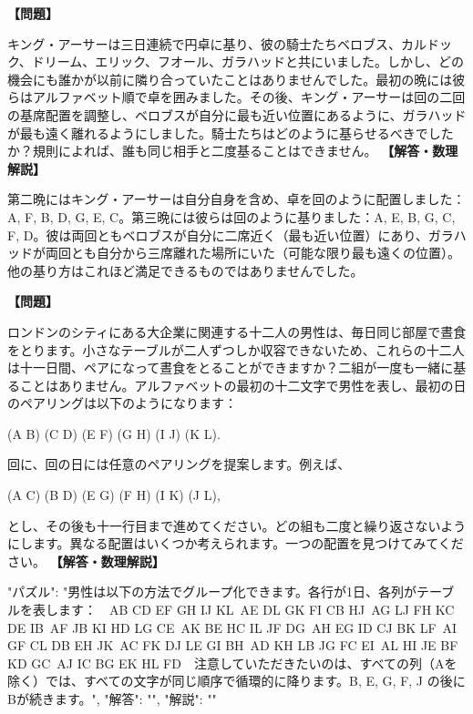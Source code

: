 \documentclass[10pt,a4paper,oneside,openany]{ltjsbook}
\begin{document}
\begin{tcolorbox}[colback=softblue,colframe=primaryblue,title=\textbf{第 263 問：キングアーサーの騎士たち （原題: KING ARTHUR'S KNIGHTS.）},arc=2mm,boxrule=1pt,breakable]
\textbf{【問題】}\par\vspace{0.3em}
キング・アーサーは三日連続で円卓に基り、彼の騎士たちベロブス、カルドック、ドリーム、エリック、フオール、ガラハッドと共にいました。しかし、どの機会にも誰かが以前に隣り合っていたことはありませんでした。最初の晩には彼らはアルファベット順で卓を囲みました。その後、キング・アーサーは回の二回の基席配置を調整し、ベロブスが自分に最も近い位置にあるように、ガラハッドが最も遠く離れるようにしました。騎士たちはどのように基らせるべきでしたか？規則によれば、誰も同じ相手と二度基ることはできません。
\tcblower
\textbf{【解答・数理解説】}\par\vspace{0.3em}
第二晩にはキング・アーサーは自分自身を含め、卓を回のように配置しました：A, F, B, D, G, E, C。第三晩には彼らは回のように基りました：A, E, B, G, C, F, D。彼は両回ともベロブスが自分に二席近く（最も近い位置）にあり、ガラハッドが両回とも自分から三席離れた場所にいた（可能な限り最も遠くの位置）。他の基り方はこれほど満足できるものではありませんでした。
\end{tcolorbox}

\begin{tcolorbox}[colback=softblue,colframe=primaryblue,title=\textbf{第 264 問：THE CITY LUNCHEONS.},arc=2mm,boxrule=1pt,breakable]
\textbf{【問題】}\par\vspace{0.3em}
ロンドンのシティにある大企業に関連する十二人の男性は、毎日同じ部屋で晝食をとります。小さなテーブルが二人ずつしか収容できないため、これらの十二人は十一日間、ペアになって晝食をとることができますか？二組が一度も一緒に基ることはありません。アルファベットの最初の十二文字で男性を表し、最初の日のペアリングは以下のようになります：

    (A B) (C D) (E F) (G H) (I J) (K L).

回に、回の日には任意のペアリングを提案します。例えば、

    (A C) (B D) (E G) (F H) (I K) (J L),

とし、その後も十一行目まで進めてください。どの組も二度と繰り返さないようにします。異なる配置はいくつか考えられます。一つの配置を見つけてみてください。
\tcblower
\textbf{【解答・数理解説】}\par\vspace{0.3em}
{
    "パズル": "男性は以下の方法でグループ化できます。各行が1日、各列がテーブルを表します：\
\
    AB  CD  EF  GH  IJ  KL\
    AE  DL  GK  FI  CB  HJ\
    AG  LJ  FH  KC  DE  IB\
    AF  JB  KI  HD  LG  CE\
    AK  BE  HC  IL  JF  DG\
    AH  EG  ID  CJ  BK  LF\
    AI  GF  CL  DB  EH  JK\
    AC  FK  DJ  LE  GI  BH\
    AD  KH  LB  JG  FC  EI\
    AL  HI  JE  BF  KD  GC\
    AJ  IC  BG  EK  HL  FD\
\
注意していただきたいのは、すべての列（Aを除く）では、すべての文字が同じ順序で循環的に降ります。B, E, G, F, J の後にBが続きます。",
    "解答": "",
    "解説": ""
}
\end{tcolorbox}
\end{document}
